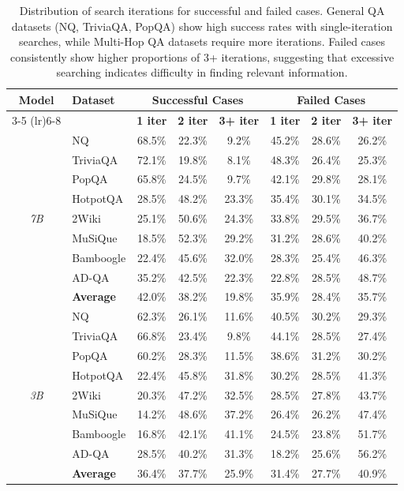 \documentclass[11pt]{article}
\begin{document}
\begin{table}[h]
\centering
\small
\begin{tabular}{cl|ccc|ccc}
\toprule
\multirow{2}{*}{\textbf{Model}} & \multirow{2}{*}{\textbf{Dataset}} & \multicolumn{3}{c|}{\textbf{Successful Cases}} & \multicolumn{3}{c}{\textbf{Failed Cases}} \\
\cmidrule(lr){3-5} \cmidrule(lr){6-8}
& & \textbf{1 iter} & \textbf{2 iter} & \textbf{3+ iter} & \textbf{1 iter} & \textbf{2 iter} & \textbf{3+ iter} \\
\midrule
\multirow{9}{*}{\textit{7B}} 
& NQ & 68.5\% & 22.3\% & 9.2\% & 45.2\% & 28.6\% & 26.2\% \\
& TriviaQA & 72.1\% & 19.8\% & 8.1\% & 48.3\% & 26.4\% & 25.3\% \\
& PopQA & 65.8\% & 24.5\% & 9.7\% & 42.1\% & 29.8\% & 28.1\% \\
& HotpotQA & 28.5\% & 48.2\% & 23.3\% & 35.4\% & 30.1\% & 34.5\% \\
& 2Wiki & 25.1\% & 50.6\% & 24.3\% & 33.8\% & 29.5\% & 36.7\% \\
& MuSiQue & 18.5\% & 52.3\% & 29.2\% & 31.2\% & 28.6\% & 40.2\% \\
& Bamboogle & 22.4\% & 45.6\% & 32.0\% & 28.3\% & 25.4\% & 46.3\% \\
& AD-QA & 35.2\% & 42.5\% & 22.3\% & 22.8\% & 28.5\% & 48.7\% \\
& \textbf{Average} & 42.0\% & 38.2\% & 19.8\% & 35.9\% & 28.4\% & 35.7\% \\
\midrule
\multirow{9}{*}{\textit{3B}} 
& NQ & 62.3\% & 26.1\% & 11.6\% & 40.5\% & 30.2\% & 29.3\% \\
& TriviaQA & 66.8\% & 23.4\% & 9.8\% & 44.1\% & 28.5\% & 27.4\% \\
& PopQA & 60.2\% & 28.3\% & 11.5\% & 38.6\% & 31.2\% & 30.2\% \\
& HotpotQA & 22.4\% & 45.8\% & 31.8\% & 30.2\% & 28.5\% & 41.3\% \\
& 2Wiki & 20.3\% & 47.2\% & 32.5\% & 28.5\% & 27.8\% & 43.7\% \\
& MuSiQue & 14.2\% & 48.6\% & 37.2\% & 26.4\% & 26.2\% & 47.4\% \\
& Bamboogle & 16.8\% & 42.1\% & 41.1\% & 24.5\% & 23.8\% & 51.7\% \\
& AD-QA & 28.5\% & 40.2\% & 31.3\% & 18.2\% & 25.6\% & 56.2\% \\
& \textbf{Average} & 36.4\% & 37.7\% & 25.9\% & 31.4\% & 27.7\% & 40.9\% \\
\bottomrule
\end{tabular}
\caption{Distribution of search iterations for successful and failed cases. General QA datasets (NQ, TriviaQA, PopQA) show high success rates with single-iteration searches, while Multi-Hop QA datasets require more iterations. Failed cases consistently show higher proportions of 3+ iterations, suggesting that excessive searching indicates difficulty in finding relevant information.}
\label{tab:search_iterations}
\end{table}
\end{document}
